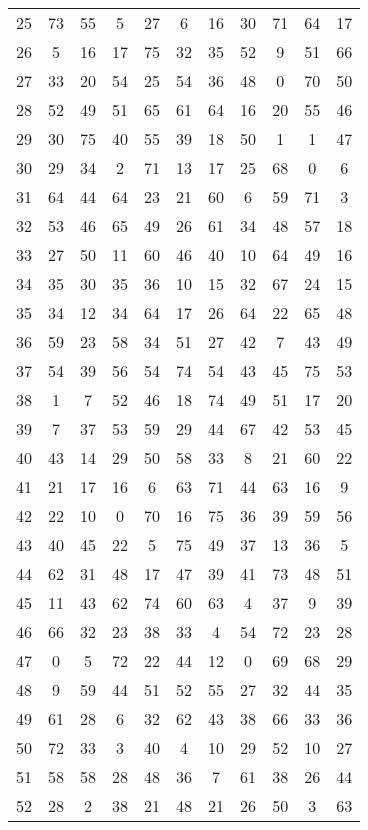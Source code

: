 \begin{table}
\begin{tabular}{c c c c c c c c c c c }
25 & 73 & 55 & 5 & 27 & 6 & 16 & 30 & 71 & 64 & 17 \\
26 & 5 & 16 & 17 & 75 & 32 & 35 & 52 & 9 & 51 & 66 \\
27 & 33 & 20 & 54 & 25 & 54 & 36 & 48 & 0 & 70 & 50 \\
28 & 52 & 49 & 51 & 65 & 61 & 64 & 16 & 20 & 55 & 46 \\
29 & 30 & 75 & 40 & 55 & 39 & 18 & 50 & 1 & 1 & 47 \\
30 & 29 & 34 & 2 & 71 & 13 & 17 & 25 & 68 & 0 & 6 \\
31 & 64 & 44 & 64 & 23 & 21 & 60 & 6 & 59 & 71 & 3 \\
32 & 53 & 46 & 65 & 49 & 26 & 61 & 34 & 48 & 57 & 18 \\
33 & 27 & 50 & 11 & 60 & 46 & 40 & 10 & 64 & 49 & 16 \\
34 & 35 & 30 & 35 & 36 & 10 & 15 & 32 & 67 & 24 & 15 \\
35 & 34 & 12 & 34 & 64 & 17 & 26 & 64 & 22 & 65 & 48 \\
36 & 59 & 23 & 58 & 34 & 51 & 27 & 42 & 7 & 43 & 49 \\
37 & 54 & 39 & 56 & 54 & 74 & 54 & 43 & 45 & 75 & 53 \\
38 & 1 & 7 & 52 & 46 & 18 & 74 & 49 & 51 & 17 & 20 \\
39 & 7 & 37 & 53 & 59 & 29 & 44 & 67 & 42 & 53 & 45 \\
40 & 43 & 14 & 29 & 50 & 58 & 33 & 8 & 21 & 60 & 22 \\
41 & 21 & 17 & 16 & 6 & 63 & 71 & 44 & 63 & 16 & 9 \\
42 & 22 & 10 & 0 & 70 & 16 & 75 & 36 & 39 & 59 & 56 \\
43 & 40 & 45 & 22 & 5 & 75 & 49 & 37 & 13 & 36 & 5 \\
44 & 62 & 31 & 48 & 17 & 47 & 39 & 41 & 73 & 48 & 51 \\
45 & 11 & 43 & 62 & 74 & 60 & 63 & 4 & 37 & 9 & 39 \\
46 & 66 & 32 & 23 & 38 & 33 & 4 & 54 & 72 & 23 & 28 \\
47 & 0 & 5 & 72 & 22 & 44 & 12 & 0 & 69 & 68 & 29 \\
48 & 9 & 59 & 44 & 51 & 52 & 55 & 27 & 32 & 44 & 35 \\
49 & 61 & 28 & 6 & 32 & 62 & 43 & 38 & 66 & 33 & 36 \\
50 & 72 & 33 & 3 & 40 & 4 & 10 & 29 & 52 & 10 & 27 \\
51 & 58 & 58 & 28 & 48 & 36 & 7 & 61 & 38 & 26 & 44 \\
52 & 28 & 2 & 38 & 21 & 48 & 21 & 26 & 50 & 3 & 63 \\

\end{tabular}
\end{table}
